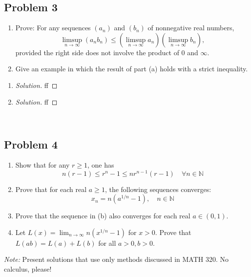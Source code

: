 \documentclass{article}
\newcommand{\N}{{\mathbb N}}
\begin{document}
\subsection*{Problem 3}
{\it \begin{enumerate}
	\item Prove: For any sequences $(a_n)$ and $(b_n)$ of nonnegative real numbers,
		\[
			\limsup_{n\to\infty}(a_nb_n) \leq \left(\limsup_{n\to\infty}a_n\right)
			\left(\limsup_{n\to\infty} b_n\right),
		\]
		provided the right side does not involve the product of $0$ and $\infty$.
	\item Give an example in which the result of part (a) holds with a strict inequality.
\end{enumerate}}

\begin{enumerate}
	\item \begin{proof}[Solution]\let\qed\relax
		ff
	\end{proof}
	\item \begin{proof}[Solution]\let\qed\relax
		ff
	\end{proof}
\end{enumerate}
\clearpage
~\clearpage

\subsection*{Problem 4}
{\it \begin{enumerate}
	\item Show that for any $r \geq 1$, one has
		\[
			n(r-1) \leq r^n - 1 \leq nr^{n-1}(r-1) \quad \forall n \in \N
		\]
	\item Prove that for each real $a \geq 1$, the following sequences converges:
		\[
			x_n = n\left(a^{1/n} - 1\right), \quad n \in \N
		\]
	\item Prove that the sequence in (b) also converges for each real $a \in (0,1)$.
	\item Let $L(x) = \lim_{n\to\infty} n\left(x^{1/n}-1\right)$ for $x > 0$.
		Prove that $L(ab) = L(a) + L(b)$ for all $a > 0, b > 0$.
\end{enumerate}
\emph{Note:} Present solutions that use only methods discussed in MATH 320.
No calculus, please!}
\end{document}
